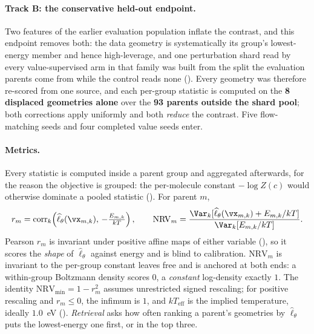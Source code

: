 \paragraph{Track B: the conservative held-out endpoint.} Two features of the earlier evaluation
population inflate the contrast, and this endpoint removes both: the data geometry is systematically
its group's lowest-energy member and hence high-leverage, and one perturbation shard read by every
value-supervised arm in that family was built from the split the evaluation parents come from while
the control reads none (). Every geometry was therefore re-scored from one source,
and each per-group
statistic is computed on the \textbf{8 displaced geometries alone} over the \textbf{93 parents
outside the shard pool}; both corrections apply uniformly and both \emph{reduce} the contrast. Five
flow-matching seeds and four completed value seeds enter.

\paragraph{Metrics.} Every statistic is computed inside a parent group and aggregated afterwards,
for the reason the objective is grouped: the per-molecule constant $-\log Z(c)$ would otherwise
dominate a pooled statistic (). For parent $m$,
\begin{equation}
  r_m = \mathrm{corr}_k\!\left(\widehat{\ell}_\theta(\vx_{m,k}),\, -\tfrac{E_{m,k}}{kT}\right),
  \qquad
  \mathrm{NRV}_m = \frac{\Var_k[\widehat{\ell}_\theta(\vx_{m,k}) + E_{m,k}/kT]}
       {\Var_k[E_{m,k}/kT]} .
  \label{eq:rm}
\end{equation}\vspace{-6pt}%
Pearson $r_m$ is invariant under positive affine maps of either variable (), so it
scores the \emph{shape} of $\widehat{\ell}_\theta$ against energy and is blind to calibration.
$\mathrm{NRV}_m$ is invariant to the per-group constant  leaves free and is
anchored at both ends: a within-group Boltzmann density scores $0$, a \emph{constant} log-density
exactly $1$. The identity $\mathrm{NRV}_{\min} = 1 - r_m^2$ assumes unrestricted signed rescaling; for positive rescaling and $r_m\leq0$, the infimum is $1$, and $kT_{\mathrm{eff}}$ is the implied temperature, ideally $1.0$~eV ().
\emph{Retrieval} asks how often ranking a parent's geometries by $\widehat{\ell}_\theta$ puts the
lowest-energy one first, or in the top three.

